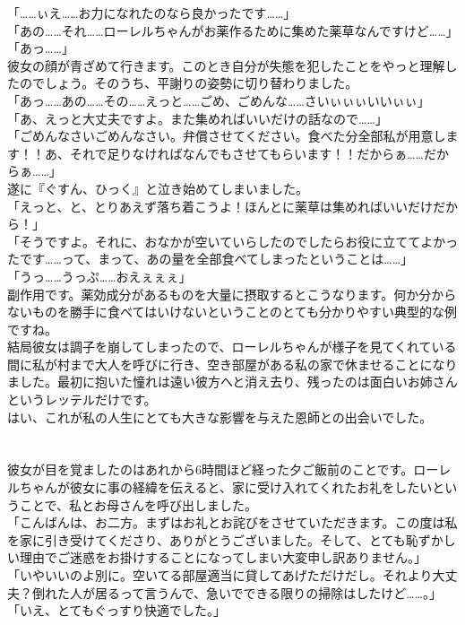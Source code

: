 \documentclass[oneside, a4paper]{jsbook}
\begin{document}
\noindent
「……ぃえ……お力になれたのなら良かったです……」\\
「あの……それ……ローレルちゃんがお薬作るために集めた薬草なんですけど……」\\
「あっ……」\\

彼女の顔が青ざめて行きます。このとき自分が失態を犯したことをやっと理解したのでしょう。そのうち、平謝りの姿勢に切り替わりました。\\

\noindent
「あっ……あの……その……えっと……ごめ、ごめんな……さいぃぃぃいいぃぃ」\\
「あ、えっと大丈夫ですよ。また集めればいいだけの話なので……」\\
「ごめんなさいごめんなさい。弁償させてください。食べた分全部私が用意します！！あ、それで足りなければなんでもさせてもらいます！！だからぁ……だからぁ……」\\

遂に『ぐすん、ひっく』と泣き始めてしまいました。\\

「えっと、と、とりあえず落ち着こうよ！ほんとに薬草は集めればいいだけだから！」\\
「そうですよ。それに、おなかが空いていらしたのでしたらお役に立ててよかったです……って、まって、あの量を全部食べてしまったということは……」\\
「うっ……うっぷ……おえぇぇぇ」\\

副作用です。薬効成分があるものを大量に摂取するとこうなります。何か分からないものを勝手に食べてはいけないということのとても分かりやすい典型的な例ですね。\\

結局彼女は調子を崩してしまったので、ローレルちゃんが様子を見てくれている間に私が村まで大人を呼びに行き、空き部屋がある私の家で休ませることになりました。最初に抱いた憧れは遠い彼方へと消え去り、残ったのは面白いお姉さんというレッテルだけです。\\

はい、これが私の人生にとても大きな影響を与えた恩師との出会いでした。\\\\\\

彼女が目を覚ましたのはあれから6時間ほど経った夕ご飯前のことです。ローレルちゃんが彼女に事の経緯を伝えると、家に受け入れてくれたお礼をしたいということで、私とお母さんを呼び出しました。\\

「こんばんは、お二方。まずはお礼とお詫びをさせていただきます。この度は私を家に引き受けてくださり、ありがとうございました。そして、とても恥ずかしい理由でご迷惑をお掛けすることになってしまい大変申し訳ありません。」\\
「いやいいのよ別に。空いてる部屋適当に貸してあげただけだし。それより大丈夫？倒れた人が居るって言うんで、急いでできる限りの掃除はしたけど……。」\\
「いえ、とてもぐっすり快適でした。」\\
\end{document}
